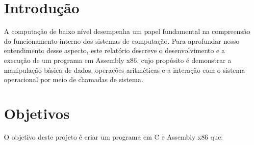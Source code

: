 \documentclass[
	12pt,				%
	openright,			%
	oneside,			%
	a4paper,			%
	chapter=TITLE,		%
	english,			%
	french,				%
	spanish,			%
	brazil				%
	]{abntex2}
\theoremstyle{definition}
\begin{document}
\frenchspacing 

\imprimircapa


\imprimirfolhaderosto

\newpage

\setlength{\absparsep}{18pt} %

\tableofcontents*
\cleardoublepage
\textual


\chapter{Introdução}

A computação de baixo nível desempenha um papel fundamental na compreensão 
do funcionamento interno dos sistemas de computação. Para aprofundar nosso entendimento 
desse aspecto, este relatório descreve o desenvolvimento e a execução de um programa 
em Assembly x86, cujo propósito é demonstrar a manipulação básica de dados,
operações aritméticas e a interação com o sistema operacional por meio de chamadas de sistema.
\chapter{Objetivos}

O objetivo deste projeto é criar um programa em C e Assembly x86 que:
\end{document}
